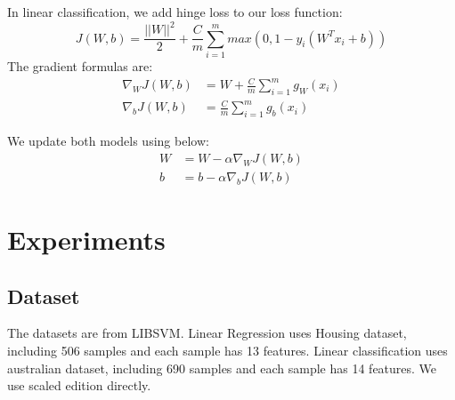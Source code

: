 \documentclass[journal, a4paper]{IEEEtran}
\begin{document}
In linear classification, we add hinge loss to our loss function:
\begin{equation} \label{eq:linear classification loss function}
    J(W,b) = \frac{||W||^2}2+\frac{C}m\sum_{i=1}^{m}max(0,1-y_i(W^Tx_i+b))
\end{equation}
The gradient formulas are:
\begin{equation} \label{eq:linear classification gradient formula}
    \begin{aligned}
        \nabla_WJ(W,b) &= W+\frac{C}m\sum_{i=1}^{m}g_W(x_i)\\
        \nabla_bJ(W,b) &= \frac{C}m\sum_{i=1}^{m}g_b(x_i)
    \end{aligned}
\end{equation}

We update both models using below:
\begin{equation} \label{eq:update parameters formula}
    \begin{aligned}
        W&=W-\alpha \nabla_WJ(W,b)\\
        b&=b-\alpha \nabla_bJ(W,b)
    \end{aligned}
\end{equation}








\section{Experiments}
\subsection{Dataset}
The datasets are from LIBSVM.
Linear Regression uses Housing dataset, including 506 samples and each sample has 13 features.
Linear classification uses australian dataset, including 690 samples and each sample has 14 features.
We use scaled edition directly.
\end{document}
